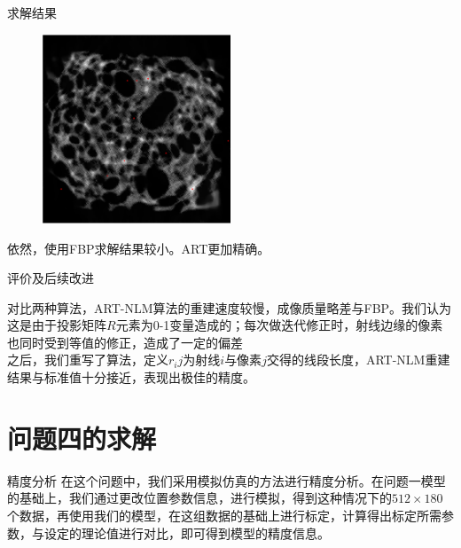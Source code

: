 \documentclass[serif]{beamer} %
\begin{document}
\begin{frame}{求解结果}
	\begin{figure}[H]
		\centering
		\includegraphics[width=0.5\textwidth]{./pic/res3.png}\\
	\end{figure}
	\small 依然，使用FBP求解结果较小。ART更加精确。  
\end{frame}
  
  
  
\begin{frame}{评价及后续改进}
	  
	对比两种算法，ART-NLM算法的重建速度较慢，成像质量略差与FBP。我们认为这是由于投影矩阵$R$元素为0-1变量造成的；每次做迭代修正时，射线边缘的像素也同时受到等值的修正，造成了一定的偏差\\
	  
	之后，我们重写了算法，定义\(r_ij\)为射线$i$与像素$j$交得的线段长度，ART-NLM重建结果与标准值十分接近，表现出极佳的精度。
	  
\end{frame}
\section{问题四的求解}
\begin{frame}{精度分析}
	在这个问题中，我们采用模拟仿真的方法进行精度分析。在问题一模型的基础上，我们通过更改位置参数信息，进行模拟，得到这种情况下的\(512\times180\)个数据，再使用我们的模型，在这组数据的基础上进行标定，计算得出标定所需参数，与设定的理论值进行对比，即可得到模型的精度信息。
\end{frame}
\end{document}
